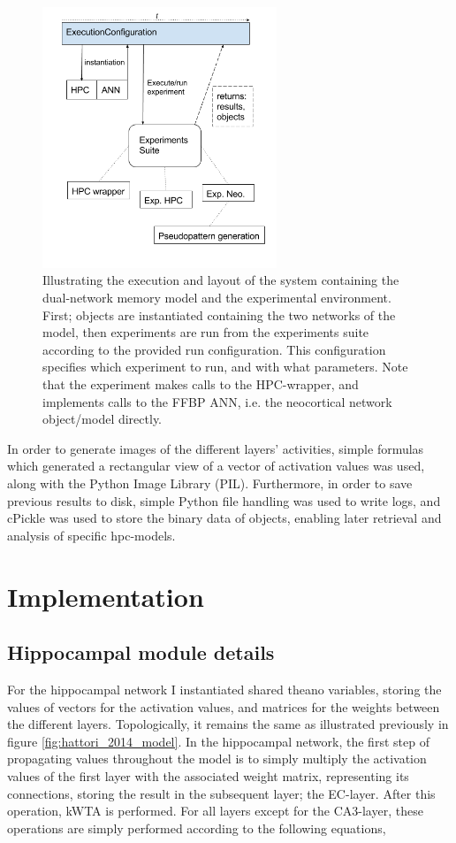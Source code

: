 \begin{figure}
    \centering
    \includegraphics[width=7cm]{fig/ExecutionConfiguration.png}
    \caption{Illustrating the execution and layout of the system containing the dual-network memory model and the experimental environment. First; objects are instantiated containing the two networks of the model, then experiments are run from the experiments suite according to the provided run configuration. This configuration specifies which experiment to run, and with what parameters. Note that the experiment makes calls to the HPC-wrapper, and implements calls to the FFBP ANN, i.e. the neocortical network object/model directly.}
    \label{fig:system_layout}
\end{figure}

In order to generate images of the different layers' activities, simple formulas which generated a rectangular view of a vector of activation values was used, along with the Python Image Library (PIL). Furthermore, in order to save previous results to disk, simple Python file handling was used to write logs, and cPickle was used to store the binary data of objects, enabling later retrieval and analysis of specific hpc-models.

\section{Implementation}

\subsection{Hippocampal module details}

For the hippocampal network I instantiated shared theano variables, storing the values of vectors for the activation values, and matrices for the weights between the different layers. Topologically, it remains the same as illustrated previously in figure \ref{fig:hattori_2014_model}. In the hippocampal network, the first step of propagating values throughout the model is to simply multiply the activation values of the first layer with the associated weight matrix, representing its connections, storing the result in the subsequent layer; the EC-layer. After this operation, kWTA is performed. For all layers except for the CA3-layer, these operations are simply performed according to the following equations,

